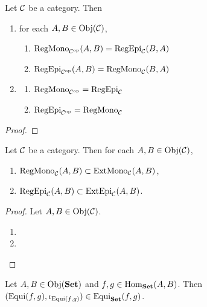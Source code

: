 \documentclass{book}
\begin{document}
	\begin{ex}
		Let $\mathcal{C}$ be a category. Then
		\begin{enumerate}
			\item for each $A,B \in \operatorname{Obj}(\mathcal{C})$,
			\begin{enumerate}
				\item $\operatorname{RegMono}_{{\mathcal{C}}^{\text{op}}}(A,B) = \operatorname{RegEpi}_{\mathcal{C}}(B,A)$
				\item $\operatorname{RegEpi}_{{\mathcal{C}}^{\text{op}}}(A,B) = \operatorname{RegMono}_{\mathcal{C}}(B,A)$
			\end{enumerate}
			\item 
			\begin{enumerate}
				\item $\operatorname{RegMono}_{{\mathcal{C}}^{\text{op}}} = \operatorname{RegEpi}_{\mathcal{C}}$
				\item $\operatorname{RegEpi}_{{\mathcal{C}}^{\text{op}}} = \operatorname{RegMono}_{\mathcal{C}}$
			\end{enumerate}
		\end{enumerate}
	\end{ex}
	
	\begin{proof}
	\end{proof}
	
	\begin{ex}
		Let $\mathcal{C}$ be a category. Then for each $A,B \in \operatorname{Obj}(\mathcal{C})$,
		\begin{enumerate}
			\item $\operatorname{RegMono}_{\mathcal{C}}(A,B) \subset \operatorname{ExtMono}_{\mathcal{C}}(A,B)$,
			\item $\operatorname{RegEpi}_{\mathcal{C}}(A,B) \subset \operatorname{ExtEpi}_{\mathcal{C}}(A,B)$.
		\end{enumerate}
	\end{ex}
	
	\begin{proof}
		Let $A,B \in \operatorname{Obj}(\mathcal{C})$. 
		\begin{enumerate}
			\item 
			\item 
		\end{enumerate}
	\end{proof}
	
	\begin{ex}
		Let $A,B \in \operatorname{Obj}(\text{\textbf{Set}})$ and $f,g \in \operatorname{Hom}_{\text{\textbf{Set}}}(A,B)$. Then $(\operatorname{Equi}(f,g), \iota_{\operatorname{Equi}(f,g)}) \in \operatorname{Equi}_{\text{\textbf{Set}}}(f,g)$.
	\end{ex}
	
\end{document}
